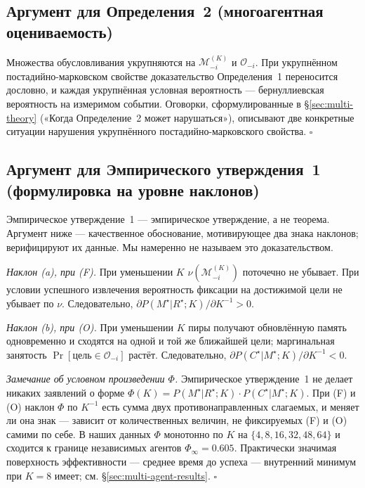 \documentclass{article}
\begin{document}
\subsection{Аргумент для Определения~2 (многоагентная оцениваемость)}

Множества обусловливания укрупняются на $\mathcal{M}_{-i}^{(K)}$ и $\mathcal{O}_{-i}$. При укрупнённом постадийно-марковском свойстве доказательство Определения~1 переносится дословно, и каждая укрупнённая условная вероятность --- бернуллиевская вероятность на измеримом событии. Оговорки, сформулированные в \S\ref{sec:multi-theory} («Когда Определение~2 может нарушаться»), описывают две конкретные ситуации нарушения укрупнённого постадийно-марковского свойства. \hfill$\square$

\subsection{Аргумент для Эмпирического утверждения~1 (формулировка на уровне наклонов)}

Эмпирическое утверждение~1 --- эмпирическое утверждение, а не теорема. Аргумент ниже --- качественное обоснование, мотивирующее два знака наклонов; верифицируют их данные. Мы намеренно не называем это доказательством.

\emph{Наклон (a), при (F).} При уменьшении $K$ $\nu(\mathcal{M}_{-i}^{(K)})$ поточечно не убывает. При условии успешного извлечения вероятность фиксации на достижимой цели не убывает по $\nu$. Следовательно, $\partial P(M^\star|R^\star;K) / \partial K^{-1} > 0$.

\emph{Наклон (b), при (O).} При уменьшении $K$ пиры получают обновлённую память одновременно и сходятся на одной и той же ближайшей цели; маргинальная занятость $\Pr[\text{цель}\in\mathcal{O}_{-i}]$ растёт. Следовательно, $\partial P(C^\star|M^\star;K) / \partial K^{-1} < 0$.

\emph{Замечание об условном произведении $\Phi$.} Эмпирическое утверждение~1 не делает никаких заявлений о форме $\Phi(K) = P(M^\star|R^\star;K)\!\cdot\!P(C^\star|M^\star;K)$. При (F) и (O) наклон $\Phi$ по $K^{-1}$ есть сумма двух противонаправленных слагаемых, и меняет ли она знак --- зависит от количественных величин, не фиксируемых (F) и (O) самими по себе. В наших данных $\Phi$ монотонно по $K$ на $\{4,8,16,32,48,64\}$ и сходится к границе независимых агентов $\Phi_\infty = 0.605$. Практически значимая поверхность эффективности --- среднее время до успеха --- внутренний минимум при $K=8$ имеет; см. \S\ref{sec:multi-agent-results}. \hfill$\square$
\end{document}
